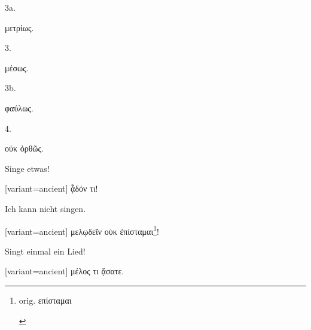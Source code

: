 3a.

\egroup\switchcolumn\bgroup

\textgreek[variant=ancient]{μετρίως.}

\egroup\switchcolumn*\bgroup

3.

\egroup\switchcolumn\bgroup

\textgreek[variant=ancient]{μέσως.}

\egroup\switchcolumn*\bgroup

3b.

\egroup\switchcolumn\bgroup

\textgreek[variant=ancient]{φαύλως.}

\egroup\switchcolumn*\bgroup

4.

\egroup\switchcolumn\bgroup

\textgreek[variant=ancient]{οὐκ ὀρθῶς.}

\egroup{}Singe etwas!

\switchcolumn

\begin{greek}[variant=ancient]%
ᾆδόν τι!

\end{greek}%
\switchcolumn*

Ich kann nicht singen. 

\switchcolumn

\begin{greek}[variant=ancient]%
μελῳδεῖν οὐκ ἐπίσταμαι\footnote{\begin{latin}%
orig. \textgreek[variant=ancient]{επίσταμαι}\end{latin}%
}!

\end{greek}%
\switchcolumn*

Singt einmal ein Lied! 

\switchcolumn

\begin{greek}[variant=ancient]%
μέλος τι ᾄσατε.

\end{greek}%
\switchcolumn*

